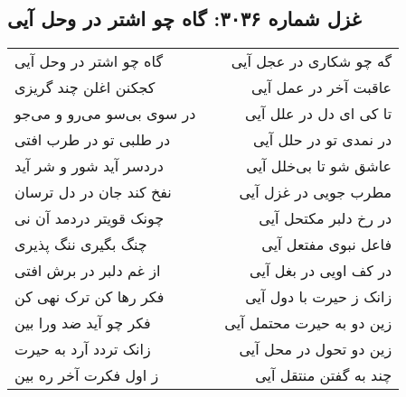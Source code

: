 \begin{center}
\section*{غزل شماره ۳۰۳۶: گاه چو اشتر در وحل آیی}
\label{sec:3036}
\begin{longtable}{l p{0.5cm} r}
گاه چو اشتر در وحل آیی
&&
گه چو شکاری در عجل آیی
\\
کجکنن اغلن چند گریزی
&&
عاقبت آخر در عمل آیی
\\
در سوی بی‌سو می‌رو و می‌جو
&&
تا کی ای دل در علل آیی
\\
در طلبی تو در طرب افتی
&&
در نمدی تو در حلل آیی
\\
دردسر آید شور و شر آید
&&
عاشق شو تا بی‌خلل آیی
\\
نفخ کند جان در دل ترسان
&&
مطرب جویی در غزل آیی
\\
چونک قویتر دردمد آن نی
&&
در رخ دلبر مکتحل آیی
\\
چنگ بگیری ننگ پذیری
&&
فاعل نبوی مفتعل آیی
\\
از غم دلبر در برش افتی
&&
در کف اویی در بغل آیی
\\
فکر رها کن ترک نهی کن
&&
زانک ز حیرت با دول آیی
\\
فکر چو آید ضد ورا بین
&&
زین دو به حیرت محتمل آیی
\\
زانک تردد آرد به حیرت
&&
زین دو تحول در محل آیی
\\
ز اول فکرت آخر ره بین
&&
چند به گفتن منتقل آیی
\\
\end{longtable}
\end{center}
